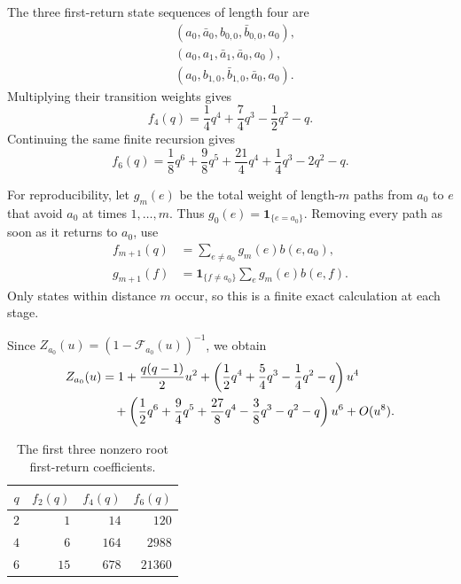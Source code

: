 \documentclass[11pt,reqno]{amsart}
\numberwithin{equation}{section}
\theoremstyle{definition}
\theoremstyle{remark}
\newcommand{\cF}{\mathcal F}
\newcommand{\one}{\mathbf 1}
\begin{document}
The three first-return state sequences of length four are
\begin{align*}
 &(a_0,\bar a_0,b_{0,0},\bar b_{0,0},a_0),\\
 &(a_0,a_1,\bar a_1,\bar a_0,a_0),\\
 &(a_0,b_{1,0},\bar b_{1,0},\bar a_0,a_0).
\end{align*}
Multiplying their transition weights gives
\begin{equation}\label{eq:f4}
 f_4(q)=\frac14q^4+\frac74q^3-\frac12q^2-q.
\end{equation}
Continuing the same finite recursion gives
\begin{equation}\label{eq:f6}
 f_6(q)=\frac18q^6+\frac98q^5+\frac{21}{4}q^4
        +\frac14q^3-2q^2-q.
\end{equation}

For reproducibility, let $g_m(e)$ be the total weight of length-$m$ paths from
$a_0$ to $e$ that avoid $a_0$ at times $1,\ldots,m$.  Thus
$g_0(e)=\one_{\{e=a_0\}}$.  Removing every path as soon as it returns to
$a_0$, use
\begin{align}
 f_{m+1}(q)&=\sum_{e\ne a_0}g_m(e)b(e,a_0),\label{eq:rec-f}\\
 g_{m+1}(f)&=\one_{\{f\ne a_0\}}
 \sum_e g_m(e)b(e,f).\label{eq:rec-p}
\end{align}
Only states within distance $m$ occur, so this is a finite exact calculation at
each stage.

Since $Z_{a_0}(u)=(1-\cF_{a_0}(u))^{-1}$, we obtain
\begin{align}
 Z_{a_0}(u)
 &=1+\frac{q(q-1)}2u^2
 +\left(\frac12q^4+\frac54q^3-\frac14q^2-q\right)u^4\notag\\
 &\quad+\left(\frac12q^6+\frac94q^5+\frac{27}{8}q^4
 -\frac38q^3-q^2-q\right)u^6+O(u^8).
\label{eq:localexpansion}
\end{align}

\begin{table}[ht]
\centering
\caption{The first three nonzero root first-return coefficients.}
\label{tab:first-return-coefficients}
\begin{tabular}{c|rrr}
\toprule
$q$ & $f_2(q)$ & $f_4(q)$ & $f_6(q)$\\
\midrule
$2$ & $1$ & $14$ & $120$\\
$4$ & $6$ & $164$ & $2988$\\
$6$ & $15$ & $678$ & $21360$\\
\bottomrule
\end{tabular}
\end{table}
\end{document}
